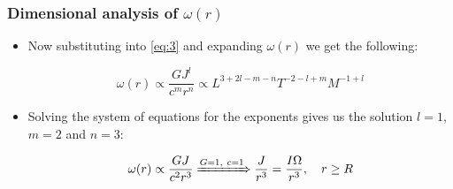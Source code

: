 \begin{frame}
\frametitle{Dimensional analysis of $\omega (r)$}

\begin{itemize}
	\item Now substituting into \eqref{eq:3} and expanding $\omega (r)$ we get the following: 
	\begin{block}{}
		\begin{equation} \label{eq:4}
			\omega (r)
			\propto
			\frac{G J^{l}}{c^{m} r^{n}}
			\propto
			L^{3 + 2l - m - n} T^{-2 - l + m} M^{-1 + l}
		\end{equation}
	\end{block}
	\item Solving the system of equations for the exponents gives us the solution $l=1$, $m=2$ and $n=3$:
	\begin{block}{}
		\begin{equation} \label{eq:5}
			\omega (r) \propto \frac{G J}{c^{2} r^{3}}
			\xRightarrow{G=1,\ c=1}
			\frac{J}{r^{3}} = \frac{I \Omega}{r^{3}}, \quad r \geq R
		\end{equation}
	\end{block}
\end{itemize}

\end{frame}